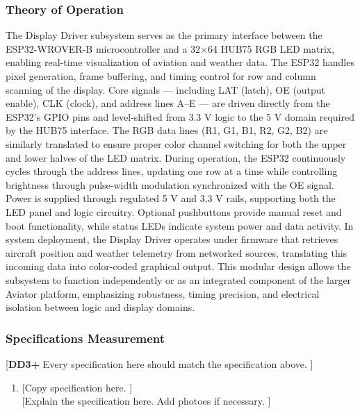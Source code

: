 \subsubsection{Theory of Operation}
The Display Driver subsystem serves as the primary interface between the ESP32-WROVER-B microcontroller and a 32×64 HUB75 RGB LED matrix, enabling real-time visualization of aviation and weather data. 
The ESP32 handles pixel generation, frame buffering, and timing control for row and column scanning of the display. 
Core signals — including LAT (latch), OE (output enable), CLK (clock), and address lines A–E — are driven directly from the ESP32’s GPIO pins and level-shifted from 3.3 V logic to the 5 V domain required by the HUB75 interface. 
The RGB data lines (R1, G1, B1, R2, G2, B2) are similarly translated to ensure proper color channel switching for both the upper and lower halves of the LED matrix. 
During operation, the ESP32 continuously cycles through the address lines, updating one row at a time while controlling brightness through pulse-width modulation synchronized with the OE signal. 
Power is supplied through regulated 5 V and 3.3 V rails, supporting both the LED panel and logic circuitry. 
Optional pushbuttons provide manual reset and boot functionality, while status LEDs indicate system power and data activity. 
In system deployment, the Display Driver operates under firmware that retrieves aircraft position and weather telemetry from networked sources, translating this incoming data into color-coded graphical output. 
This modular design allows the subsystem to function independently or as an integrated component of the larger Aviator platform, emphasizing robustness, timing precision, and electrical isolation between logic and display domains.

\subsubsection{Specifications Measurement}
[\textbf{DD3+} Every specification here should match the specification above. ]
\begin{enumerate}
    \item {[Copy specification here. ]} \\
          {[Explain the specification here. Add photoes if necessary. ]}
\end{enumerate}

